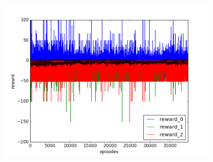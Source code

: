 \begin{figure}[t]
\begin{subfigure}[t]{\figscale\linewidth}
    \includegraphics[width=1.5\textwidth]
    {../results/maddpg_2vs1/reward.png}
    \label{fig:maddpg-2vs1-reward}
  \end{subfigure}


\end{figure}
